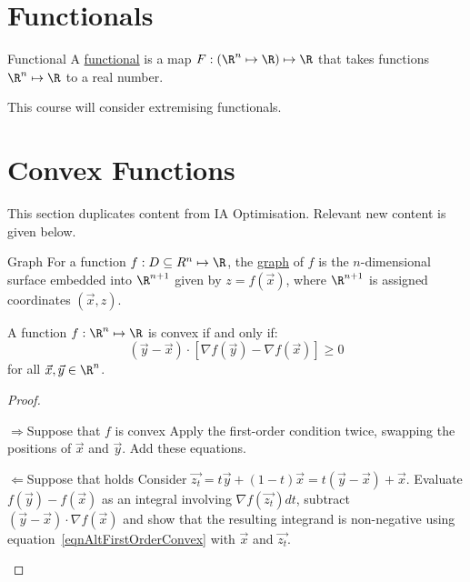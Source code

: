 \documentclass[../Main.tex]{subfiles}
\begin{document}
\section{Functionals}
\begin{definition}{Functional}
    A \underline{functional} is a map $F : (\R^n \mapsto \R) \mapsto \R$ that takes functions $\R^n \mapsto \R$ to a real number.
\end{definition}
This course will consider extremising functionals.
\section{Convex Functions}
This section duplicates content from IA Optimisation. Relevant new content is given below.

\begin{definition}{Graph}
    For a function $f : D \subseteq R^n \mapsto \R$, the \underline{graph} of $f$ is the $n$-dimensional surface embedded into $\R^{n+1}$ given by $z = f(\vec{x})$, where $\R^{n+1}$ is assigned coordinates $(\vec{x}, z)$.
\end{definition}
\begin{proposition}
    A function $f : \R^n \mapsto \R$ is convex if and only if:
    \begin{equation}
        (\vec{y} - \vec{x}) \cdot \left[\nabla f(\vec{y}) - \nabla f(\vec{x})\right] \geq 0
        \label{eqnAltFirstOrderConvex}
    \end{equation}
    for all $\vec{x}, \vec{y} \in \R^n$.
    \label{propAltFirstOrderConvex}
\end{proposition}
\begin{proof}
    \begin{proofdirection}{$\Rightarrow$}{Suppose that $f$ is convex}
        Apply the first-order condition twice, swapping the positions of $\vec{x}$ and $\vec{y}$. Add these equations.
    \end{proofdirection}
    \begin{proofdirection}{$\Leftarrow$}{Suppose that  holds}
        Consider $\vec{z_{t}} = t\vec{y} + (1-t)\vec{x} = t(\vec{y} - \vec{x}) + \vec{x}$. Evaluate $f(\vec{y}) - f(\vec{x})$ as an integral involving $\nabla f(\vec{z_{t}}) dt$, subtract $(\vec{y} - \vec{x}) \cdot \nabla f(\vec{x})$ and show that the resulting integrand is non-negative using equation~\ref{eqnAltFirstOrderConvex} with $\vec{x}$ and $\vec{z_{t}}$.
    \end{proofdirection}
\end{proof}
\end{document}
